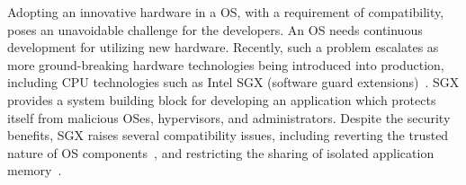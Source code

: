Adopting an innovative hardware in a OS, with a requirement of compatibility, poses an unavoidable challenge for the developers.
An OS needs continuous development for utilizing new hardware.
Recently, such a problem escalates as more ground-breaking hardware technologies
being introduced into production,
including CPU technologies such as 
Intel SGX (software guard extensions)~\cite{intelsgx}.
SGX provides a system building block for developing
an application which protects itself from malicious OSes, hypervisors, and administrators.
Despite the security benefits,
SGX raises several compatibility issues, including reverting the trusted nature of OS components~\cite{baumann14haven,osdi16scone,tsai17graphene-sgx}, and restricting the sharing of isolated application memory~\cite{shinde17panoply}.





